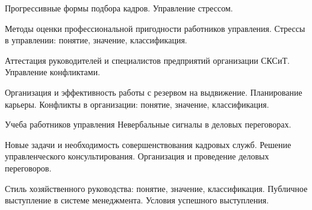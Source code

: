 \documentclass[
	14pt,
	a4paper,
	]
	{scrartcl}
\begin{document}
\vfill

\newpage


\shapk
{}
\setcounter{zad}{0}

\vfill
\z Прогрессивные формы подбора кадров.
 \vfill
\z Управление стрессом.
 \vfill

\vfill

\newpage


\shapk
{}
\setcounter{zad}{0}

\vfill
\z Методы оценки профессиональной пригодности работников управления.
 \vfill
\z Стрессы в управлении: понятие, значение, классификация.
 \vfill

\vfill

\newpage


\shapk
{}
\setcounter{zad}{0}

\vfill
\z Аттестация руководителей и специалистов предприятий организации СКСиТ.
 \vfill
\z Управление конфликтами.
 \vfill

\vfill

\newpage


\shapk
{}
\setcounter{zad}{0}

\vfill
\z Организация и эффективность работы с резервом на выдвижение. Планирование карьеры.
 \vfill
\z Конфликты в организации: понятие, значение, классификация.
 \vfill

\vfill

\newpage


\shapk
{}
\setcounter{zad}{0}

\vfill
\z Учеба работников управления
 \vfill
\z Невербальные сигналы в деловых переговорах.
 \vfill

\vfill

\newpage


\shapk
{}
\setcounter{zad}{0}

\vfill
\z Новые задачи и необходимость совершенствования кадровых служб. Решение управленческого консультирования.
 \vfill
\z Организация и проведение деловых переговоров.
 \vfill

\vfill

\newpage


\shapk
{}
\setcounter{zad}{0}

\vfill
\z Стиль хозяйственного руководства: понятие, значение, классификация.
 \vfill
\z Публичное выступление в системе менеджмента. Условия успешного выступления.
 \vfill
\end{document}
